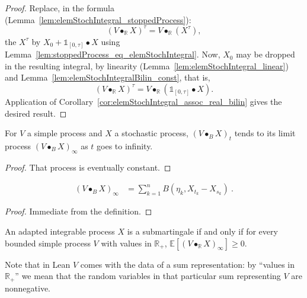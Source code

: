 \begin{proof}
Replace,
in the formula (Lemma~\ref{lem:elemStochIntegral_stoppedProcess}):
\[
  (V \bullet_{\mathbb{R}} X)^τ = V \bullet_{\mathbb{R}} (X^τ),
\]
  the $X^\tau$ by $X_0 + \mathbb{1}_{[0, τ]} \bullet X$
  using Lemma~\ref{lem:stoppedProcess_eq_elemStochIntegral}.
Now, $X_0$ may be dropped in the resulting integral,
by linearity (Lemma~\ref{lem:elemStochIntegral_linear})
and Lemma~\ref{lem:elemStochIntegralBilin_const},
that is,
\[
  (V \bullet_{\mathbb{R}} X)^τ = V \bullet_{\mathbb{R}} (\mathbb{1}_{[0, τ]} \bullet X).
\]
Application of Corollary~\ref{cor:elemStochIntegral_assoc_real_bilin}
gives the desired result.
\end{proof}



\begin{lemma}\label{lem:tendsto_elemStochIntegral_limitProcess}
For $V$ a simple process and $X$ a stochastic process, $(V \bullet_B X)_t$ tends to its limit process $(V \bullet_B X)_\infty$ as $t$ goes to infinity.
\end{lemma}

\begin{proof}
That process is eventually constant.
\end{proof}


\begin{lemma}\label{lem:limitProcess_elemStochIntegral}
\begin{align*}
  (V \bullet_B X)_\infty
  &= \sum_{k=1}^{n} B (\eta_k, X_{t_k} - X_{s_k})
  \: .
\end{align*}
\end{lemma}

\begin{proof}
  \leanok
Immediate from the definition.
\end{proof}


\begin{lemma}\label{lem:submartingale_iff_integral_elemStochIntegral_nonneg}
An adapted integrable process $X$ is a submartingale if and only if for every bounded simple process $V$ with values in $\mathbb{R}_+$, $\mathbb{E}[(V \bullet_{\mathbb{R}} X)_\infty] \ge 0$.

Note that in Lean $V$ comes with the data of a sum representation: by ``values in $\mathbb{R}_+$'' we mean that the random variables in that particular sum representing $V$ are nonnegative.
\end{lemma}

